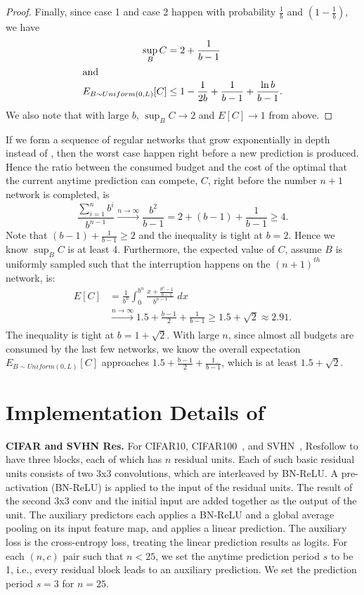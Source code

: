 \begin{proof}
Finally, since case 1 and case 2 happen with probability $\frac{1}{b}$ and $(1-\frac{1}{b})$, we have
\begin{align}
    \sup _B C &= 2+ \frac{1}{b-1} \\
\intertext{and}
    E_{B\sim Uniform(0, L)}[C] &\leq 1 - \frac{1}{2b} + \frac{1}{b-1} + \frac{\ln{b}}{b-1}.
\end{align}
We also note that with large $b$, $\sup _B C \rightarrow 2$ and $E[C] \rightarrow 1$ from above.
\end{proof}

If we form a sequence of regular networks that grow exponentially in depth instead of \ann, then the worst case happen right before a new prediction is produced. Hence the ratio between the consumed budget and the cost of the optimal that the current anytime prediction can compete, $C$, right before the number $n+1$ network is completed, is 
\[
    \frac{\sum _{i=1}^n b^i}{b^{n-1}} \xrightarrow[]{n\rightarrow \infty} \frac{b^2}{b-1} = 2 + (b-1) + \frac{1}{b-1} \geq 4. 
\]
Note that $(b-1) + \frac{1}{b-1} \geq 2$ and the inequality is tight at $b=2$. Hence we know $\sup _B {C}$ is at least 4. Furthermore, the expected value of $C$, assume $B$ is uniformly sampled such that the interruption happens on the $(n+1)^{th}$ network, is:
\begin{align*}
    E[C] &= \frac{1}{b^{n}} \int _0 ^{b^{n}} \frac{x + \frac{b^{n}-1}{b-1}}{b^{n-1}} \; dx \\ &\xrightarrow[]{n\rightarrow \infty} 1.5 + \frac{b-1}{2} + \frac{1}{b-1} \geq 1.5 + \sqrt{2} \approx 2.91.
\end{align*}
The inequality is tight at $b = 1 + \sqrt{2}$. With large $n$, since almost all budgets are consumed by the last few networks, we know the overall expectation $E_{B\sim Uniform(0, L)}[C]$ approaches $1.5 + \frac{b-1}{2} + \frac{1}{b-1}$, which is at least $1.5 + \sqrt{2}$.




\section{Implementation Details of \anns}
\label{sec:implementation_ann}


\textbf{CIFAR and SVHN Res\anns.} For CIFAR10, CIFAR100~\cite{cifar}, and SVHN~\cite{svhn}, Res\ann follow \cite{resnet} to have three blocks, each of which has $n$ residual units. Each of such basic residual units consists of two 3x3 convolutions, which are interleaved by BN-ReLU. A pre-activation (BN-ReLU) is applied to the input of the residual units. The result of the second 3x3 conv and the initial input are added together as the output of the unit. The auxiliary predictors each applies a BN-ReLU and a global average pooling on its input feature map, and applies a linear prediction. The auxiliary loss is the cross-entropy loss, treating the linear prediction results as logits. For each $(n,c)$ pair such that $n < 25$, we set the anytime prediction period $s$ to be 1, i.e., every residual block leads to an auxiliary prediction. We set the prediction period $s=3$ for $n=25$. 


